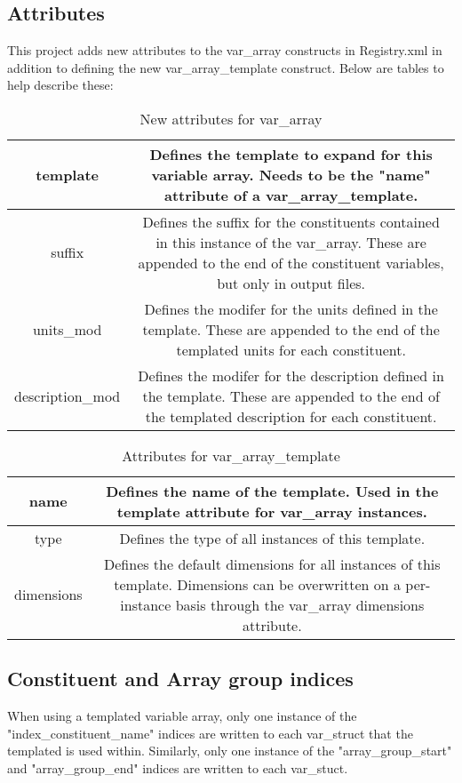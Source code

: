 \documentclass[11pt]{report}
\begin{document}
\subsection{Attributes}
This project adds new attributes to the var\_array constructs in Registry.xml
in addition to defining the new var\_array\_template construct. Below are
tables to help describe these:

\begin{table}
	\begin{tabular}{| c | c |}
		\hline
		template & Defines the template to expand for this variable array. Needs to be the "name" attribute of a var\_array\_template. \\
		\hline
		suffix & Defines the suffix for the constituents contained in this instance of the var\_array. These are appended to the end of the constituent variables, but only in output files. \\
		\hline
		units\_mod & Defines the modifer for the units defined in the template. These are appended to the end of the templated units for each constituent. \\
		\hline
		description\_mod & Defines the modifer for the description defined in the template. These are appended to the end of the templated description for each constituent. \\
		\hline
	\end{tabular}
	\caption{New attributes for var\_array}
\end{table}

\begin{table}
	\begin{tabular}{| c | c |}
		\hline
		name & Defines the name of the template. Used in the template attribute for var\_array instances. \\
		\hline
		type & Defines the type of all instances of this template. \\
		\hline
		dimensions & Defines the default dimensions for all instances of this template. Dimensions can be overwritten on a per-instance basis through the var\_array dimensions attribute. \\
		\hline
	\end{tabular}
	\caption{Attributes for var\_array\_template}
\end{table}

\subsection{Constituent and Array group indices}
When using a templated variable array, only one instance of the
"index\_constituent\_name" indices are written to each var\_struct that the
templated is used within. Similarly, only one instance of the
"array\_group\_start" and "array\_group\_end" indices are written to each
var\_stuct. 
\end{document}
